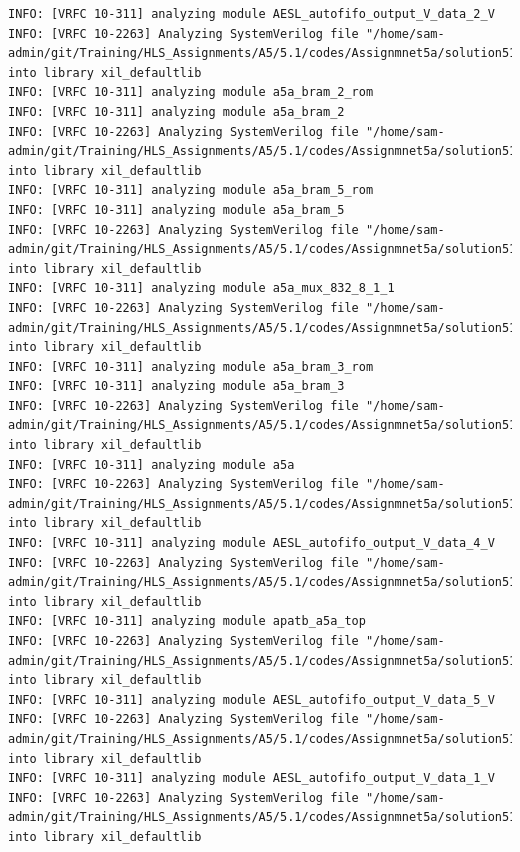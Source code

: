 \documentclass{article}
\begin{document}
\begin{lstlisting}
INFO: [VRFC 10-311] analyzing module AESL_autofifo_output_V_data_2_V
INFO: [VRFC 10-2263] Analyzing SystemVerilog file "/home/sam-admin/git/Training/HLS_Assignments/A5/5.1/codes/Assignmnet5a/solution51a/sim/verilog/a5a_bram_2.v" into library xil_defaultlib
INFO: [VRFC 10-311] analyzing module a5a_bram_2_rom
INFO: [VRFC 10-311] analyzing module a5a_bram_2
INFO: [VRFC 10-2263] Analyzing SystemVerilog file "/home/sam-admin/git/Training/HLS_Assignments/A5/5.1/codes/Assignmnet5a/solution51a/sim/verilog/a5a_bram_5.v" into library xil_defaultlib
INFO: [VRFC 10-311] analyzing module a5a_bram_5_rom
INFO: [VRFC 10-311] analyzing module a5a_bram_5
INFO: [VRFC 10-2263] Analyzing SystemVerilog file "/home/sam-admin/git/Training/HLS_Assignments/A5/5.1/codes/Assignmnet5a/solution51a/sim/verilog/a5a_mux_832_8_1_1.v" into library xil_defaultlib
INFO: [VRFC 10-311] analyzing module a5a_mux_832_8_1_1
INFO: [VRFC 10-2263] Analyzing SystemVerilog file "/home/sam-admin/git/Training/HLS_Assignments/A5/5.1/codes/Assignmnet5a/solution51a/sim/verilog/a5a_bram_3.v" into library xil_defaultlib
INFO: [VRFC 10-311] analyzing module a5a_bram_3_rom
INFO: [VRFC 10-311] analyzing module a5a_bram_3
INFO: [VRFC 10-2263] Analyzing SystemVerilog file "/home/sam-admin/git/Training/HLS_Assignments/A5/5.1/codes/Assignmnet5a/solution51a/sim/verilog/a5a.v" into library xil_defaultlib
INFO: [VRFC 10-311] analyzing module a5a
INFO: [VRFC 10-2263] Analyzing SystemVerilog file "/home/sam-admin/git/Training/HLS_Assignments/A5/5.1/codes/Assignmnet5a/solution51a/sim/verilog/AESL_autofifo_output_V_data_4_V.v" into library xil_defaultlib
INFO: [VRFC 10-311] analyzing module AESL_autofifo_output_V_data_4_V
INFO: [VRFC 10-2263] Analyzing SystemVerilog file "/home/sam-admin/git/Training/HLS_Assignments/A5/5.1/codes/Assignmnet5a/solution51a/sim/verilog/a5a.autotb.v" into library xil_defaultlib
INFO: [VRFC 10-311] analyzing module apatb_a5a_top
INFO: [VRFC 10-2263] Analyzing SystemVerilog file "/home/sam-admin/git/Training/HLS_Assignments/A5/5.1/codes/Assignmnet5a/solution51a/sim/verilog/AESL_autofifo_output_V_data_5_V.v" into library xil_defaultlib
INFO: [VRFC 10-311] analyzing module AESL_autofifo_output_V_data_5_V
INFO: [VRFC 10-2263] Analyzing SystemVerilog file "/home/sam-admin/git/Training/HLS_Assignments/A5/5.1/codes/Assignmnet5a/solution51a/sim/verilog/AESL_autofifo_output_V_data_1_V.v" into library xil_defaultlib
INFO: [VRFC 10-311] analyzing module AESL_autofifo_output_V_data_1_V
INFO: [VRFC 10-2263] Analyzing SystemVerilog file "/home/sam-admin/git/Training/HLS_Assignments/A5/5.1/codes/Assignmnet5a/solution51a/sim/verilog/a5a_bram_1.v" into library xil_defaultlib

\end{lstlisting}
\end{document}
